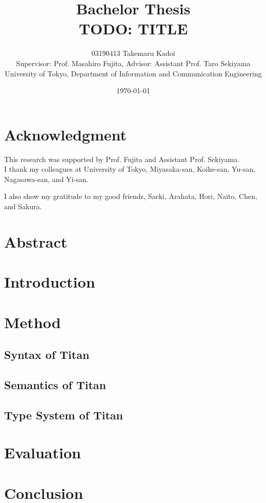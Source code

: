 \documentclass[10pt, a4paper, titlepage]{article}
\title{Bachelor Thesis \\ TODO: TITLE}
\author{
03190413 Takemaru Kadoi 
\\[1cm]
{\small Supervisor: Prof. Masahiro Fujita},
{\small Advisor: Assistant Prof. Taro Sekiyama}
\\[1cm]
{\small University of Tokyo, Department of Information and Communication Engineering}}
\date{\today}
\begin{document}
\maketitle
\newpage
\tableofcontents
\newpage

\section{Acknowledgment} %
This research was supported by Prof. Fujita and Assistant Prof. Sekiyama. \\
I thank my colleagues at University of Tokyo, Miyasaka-san, Koike-san, Yu-san, Nagasawa-san, and Yi-san.

I also show my gratitude to my good friends, Saeki, Arahata, Hori, Naito, Chen, and Sakura.

\section{Abstract} %

\cite{gulwani2017program}

\section{Introduction} %
\section{Method} %
\subsection{Syntax of Titan}
\subsection{Semantics of Titan}
\subsection{Type System of Titan}
\section{Evaluation} %
\section{Conclusion} %


\end{document}

